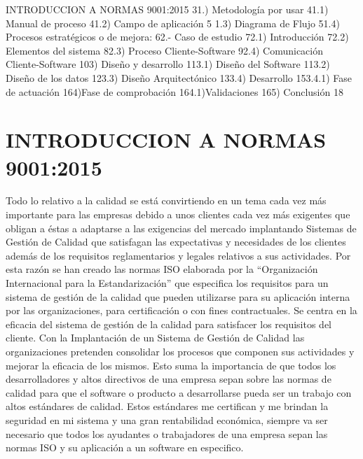 \documentclass{article} %
\begin{document}
INTRODUCCION A NORMAS 9001:2015 31.) Metodolog\'{i}a por usar 41.1) Manual de proceso 41.2) Campo de aplicaci\'{o}n 5 1.3) Diagrama de Flujo 51.4) Procesos estrat\'{e}gicos o de mejora: 62.- Caso de estudio 72.1) Introducci\'{o}n 72.2) Elementos del sistema 82.3) Proceso Cliente-Software 92.4) Comunicaci\'{o}n Cliente-Software 103) Dise\~{n}o y desarrollo 113.1) Dise\~{n}o del Software 113.2) Dise\~{n}o de los datos 123.3) Dise\~{n}o Arquitect\'{o}nico 133.4) Desarrollo 153.4.1) Fase de actuaci\'{o}n 164)Fase de comprobaci\'{o}n 164.1)Validaciones 165) Conclusi\'{o}n 18


\section{}

\noindent 

\noindent 
\section{INTRODUCCION A NORMAS 9001:2015}

\noindent Todo lo relativo a la calidad se est\'{a} convirtiendo en un tema cada vez m\'{a}s importante para las empresas debido a unos clientes cada vez m\'{a}s exigentes que obligan a \'{e}stas a adaptarse a las exigencias del mercado implantando Sistemas de Gesti\'{o}n de Calidad que satisfagan las expectativas y necesidades de los clientes adem\'{a}s de los requisitos reglamentarios y legales relativos a sus actividades. Por esta raz\'{o}n se han creado las normas ISO elaborada por la ``Organizaci\'{o}n Internacional para la Estandarizaci\'{o}n'' que especifica los requisitos para un sistema de gesti\'{o}n de la calidad que pueden utilizarse para su aplicaci\'{o}n interna por las organizaciones, para certificaci\'{o}n o con fines contractuales. Se centra en la eficacia del sistema de gesti\'{o}n de la calidad para satisfacer los requisitos del cliente.   Con la Implantaci\'{o}n de un Sistema de Gesti\'{o}n de Calidad las organizaciones pretenden consolidar los procesos que componen sus actividades y mejorar la eficacia de los mismos. Esto suma la importancia de que todos los desarrolladores y altos directivos de una empresa sepan sobre las normas de calidad para que el software o producto a desarrollarse pueda ser un trabajo con altos est\'{a}ndares de calidad. Estos est\'{a}ndares me certifican y me brindan la seguridad en mi sistema y una gran rentabilidad econ\'{o}mica, siempre va ser necesario que todos los ayudantes o trabajadores de una empresa sepan las normas ISO y su aplicaci\'{o}n a un software en especifico.
\end{document}
